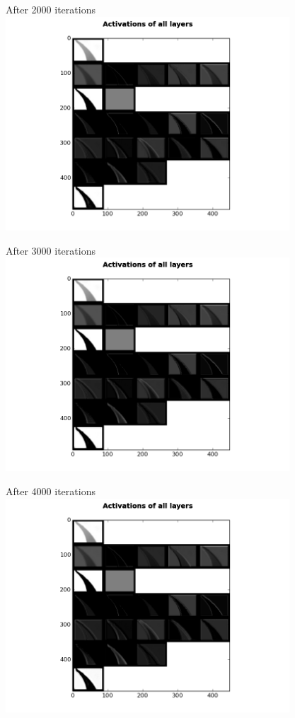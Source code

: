 \begin{frame}{After 2000 iterations}
\includegraphics[height=8.0cm]{data/activations/output-2000.png}\\ 
\end{frame}

\begin{frame}{After 3000 iterations}
\includegraphics[height=8.0cm]{data/activations/output-3000.png}\\ 
\end{frame}

\begin{frame}{After 4000 iterations}
\includegraphics[height=8.0cm]{data/activations/output-4000.png}\\ 
\end{frame}

